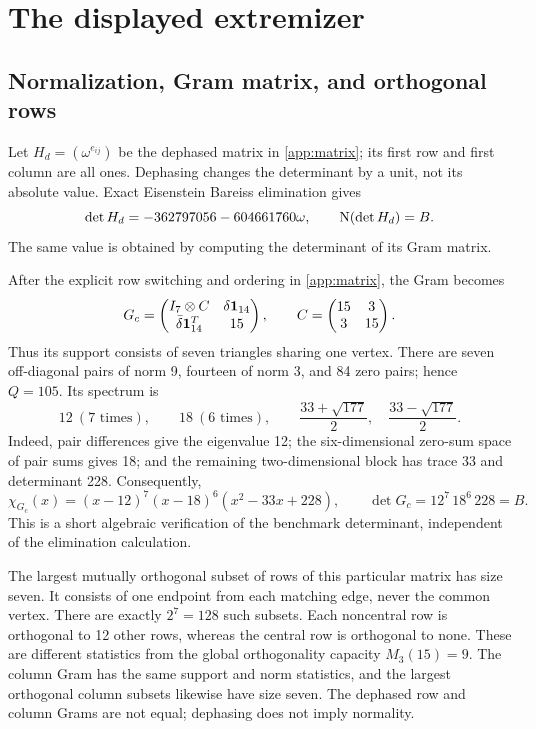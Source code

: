 \section{The displayed extremizer}\label{sec:witness}
\subsection{Normalization, Gram matrix, and orthogonal rows}
Let $H_d=(\omega^{e_{ij}})$ be the dephased matrix in \cref{app:matrix}; its first row and first column are all ones. Dephasing changes the determinant by a unit, not its absolute value. Exact Eisenstein Bareiss elimination gives
\begin{equation}\label{eq:dephased-det}
 \det H_d=-362797056-604661760\omega,
 \qquad \operatorname N(\det H_d)=B.
\end{equation}
The same value is obtained by computing the determinant of its Gram matrix.

After the explicit row switching and ordering in \cref{app:matrix}, the Gram becomes
\begin{equation}\label{eq:canonical-gram}
 G_c=
 \begin{pmatrix}
 I_7\otimes C&\delta\mathbf1_{14}\\
 \bar\delta\mathbf1_{14}^T&15
 \end{pmatrix},\qquad
 C=\begin{pmatrix}15&3\\3&15\end{pmatrix}.
\end{equation}
Thus its support consists of seven triangles sharing one vertex. There are seven off-diagonal pairs of norm 9, fourteen of norm 3, and 84 zero pairs; hence $Q=105$. Its spectrum is
\begin{equation}\label{eq:witness-spectrum}
 12\ (7\text{ times}),\qquad18\ (6\text{ times}),\qquad
 \frac{33+\sqrt{177}}2,\quad\frac{33-\sqrt{177}}2.
\end{equation}
Indeed, pair differences give the eigenvalue 12; the six-dimensional zero-sum space of pair sums gives 18; and the remaining two-dimensional block has trace 33 and determinant 228. Consequently,
\[
 \chi_{G_c}(x)=(x-12)^7(x-18)^6(x^2-33x+228),\qquad
 \det G_c=12^7\,18^6\,228=B.
\]
This is a short algebraic verification of the benchmark determinant, independent of the elimination calculation.

The largest mutually orthogonal subset of rows of this particular matrix has size seven. It consists of one endpoint from each matching edge, never the common vertex. There are exactly $2^7=128$ such subsets. Each noncentral row is orthogonal to 12 other rows, whereas the central row is orthogonal to none. These are different statistics from the global orthogonality capacity $M_3(15)=9$. The column Gram has the same support and norm statistics, and the largest orthogonal column subsets likewise have size seven. The dephased row and column Grams are not equal; dephasing does not imply normality.

